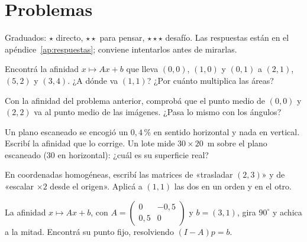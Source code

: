 \section{Problemas}\label{sec:problemas-04}

Graduados: \({\star}\) directo, \({\star}{\star}\) para pensar, \({\star}{\star}{\star}\) desafío. Las respuestas están en el apéndice~\ref{ap:respuestas}; conviene intentarlos antes de mirarlas.

\begin{problema}[\({\star}\)]\label{pb:04-1}
Encontrá la afinidad \(x\mapsto Ax+b\) que lleva \((0,0)\), \((1,0)\) y \((0,1)\) a \((2,1)\), \((5,2)\) y \((3,4)\). ¿A dónde va \((1,1)\)? ¿Por cuánto multiplica las áreas?
\end{problema}

\begin{problema}[\({\star}{\star}\)]\label{pb:04-2}
Con la afinidad del problema anterior, comprobá que el punto medio de \((0,0)\) y \((2,2)\) va al punto medio de las imágenes. ¿Pasa lo mismo con los ángulos?
\end{problema}

\begin{problema}[\({\star}{\star}\)]\label{pb:04-3}
Un plano escaneado se encogió un \(0{,}4\)\,\% en sentido horizontal y nada en vertical. Escribí la afinidad que lo corrige. Un lote mide \(30\times20\)~m sobre el plano escaneado (\(30\) en horizontal): ¿cuál es su superficie real?
\end{problema}

\begin{problema}[\({\star}{\star}\)]\label{pb:04-4}
En coordenadas homogéneas, escribí las matrices de «trasladar \((2,3)\)» y de «escalar \(\times2\) desde el origen». Aplicá a \((1,1)\) las dos en un orden y en el otro.
\end{problema}

\begin{problema}[\({\star}{\star}{\star}\)]\label{pb:04-5}
La afinidad \(x\mapsto Ax+b\), con \(A=\begin{pmatrix}0&-0{,}5\\0{,}5&0\end{pmatrix}\) y \(b=(3,1)\), gira \(90^\circ\) y achica a la mitad. Encontrá su punto fijo, resolviendo \((I-A)p=b\).
\end{problema}
